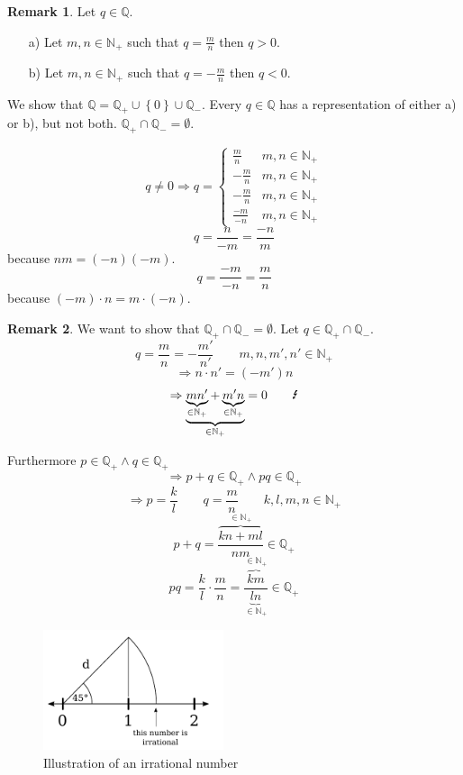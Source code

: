 \documentclass[a4paper,landscape,twocolumn]{article}
\theoremstyle{definition}
\newtheorem{rem}{Remark}
\newcommand\set[1]{\left\{#1\right\}}
\begin{document}
\begin{rem}
  Let $q \in \mathbb{Q}$.
  \begin{itemize}
    \item[a)] Let $m,n \in \mathbb{N}_+$ such that $q = \frac mn$ then $q > 0$.
    \item[b)] Let $m,n \in \mathbb{N}_+$ such that $q = -\frac mn$ then $q < 0$.
  \end{itemize}

  We show that $\mathbb{Q} = \mathbb{Q}_+ \cup \set{0} \cup \mathbb{Q}_-$.
  Every $q \in \mathbb{Q}$ has a representation of either a) or b), but not both.
  $\mathbb{Q}_+ \cap \mathbb{Q}_- = \emptyset$.

  \[
    q \neq 0 \Rightarrow q = \begin{cases}
      \frac mn & m,n \in \mathbb{N}_+ \\
      -\frac mn & m,n \in \mathbb{N}_+ \\
      -\frac mn & m,n \in \mathbb{N}_+ \\
      \frac{-m}{-n} & m,n \in \mathbb{N}_+
    \end{cases}
  \]
  \[ q = \frac{n}{-m} = \frac{-n}{m} \]
  because $nm = (-n)(-m)$.
  \[ q = \frac{-m}{-n} = \frac mn \]
  because $(-m) \cdot n = m \cdot (-n)$.
\end{rem}

\begin{rem}
  We want to show that $\mathbb{Q}_+ \cap \mathbb{Q}_- = \emptyset$.
  Let $q \in \mathbb{Q}_+ \cap \mathbb{Q}_-$.
  \[ q = \frac mn = -\frac{m'}{n'} \qquad m,n,m',n' \in \mathbb{N}_+ \]
  \[ \Rightarrow n \cdot n' = (-m') n \]
  \[ \Rightarrow \underbrace{\underbrace{mn'}_{\in \mathbb{N}_+} + \underbrace{m' n}_{\in \mathbb{N}_+}}_{\in \mathbb{N}_+} = 0 \qquad\text{\Lightning} \]

  Furthermore $p \in \mathbb{Q}_+ \land q \in \mathbb{Q}_+$
  \[ \Rightarrow p + q \in \mathbb{Q}_+ \land pq \in \mathbb{Q}_+ \]
  \[ \Rightarrow p = \frac kl \qquad q = \frac mn \qquad k,l,m,n \in \mathbb{N}_+ \]
  \[ p + q = \frac{\overbrace{kn + ml}^{\in \mathbb{N}_+}}{nm} \in \mathbb{Q}_+ \]
  \[ pq = \frac{k}{l} \cdot \frac mn = \frac{\overbrace{km}^{\in \mathbb{N}_+}}{\underbrace{ln}_{\in \mathbb{N}_+}} \in \mathbb{Q}_+ \]
\end{rem}

\begin{figure}[!h]
  \begin{center}
    \includegraphics[width=200px]{img/irrational_number.pdf}
    \caption{Illustration of an irrational number}
  \end{center}
\end{figure}
\end{document}
